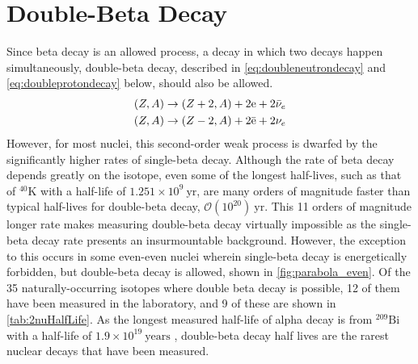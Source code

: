 \section{Double-Beta Decay}
\label{sec:Double Beta Decay}
Since beta decay is an allowed process, a decay in which two decays happen simultaneously, double-beta decay, described in \autoref{eq:doubleneutrondecay} and \autoref{eq:doubleprotondecay} below, should also be allowed.
\begin{align}
    (Z, A) & \rightarrow (Z+2, A)+2\textrm{e}+2\Bar{\nu}_e \label{eq:doubleneutrondecay} \\
    (Z, A) & \rightarrow (Z-2, A)+2\Bar{\textrm{e}}+2\nu_e \label{eq:doubleprotondecay} 
\end{align}
However, for most nuclei, this second-order weak process is dwarfed by the significantly higher rates of single-beta decay.
Although the rate of beta decay depends greatly on the isotope, even some of the longest half-lives, such as that of $^{40}$K with a half-life of $1.251\times10^{9}~\textrm{yr}$, are many orders of magnitude faster than typical half-lives for double-beta decay, $\mathcal{O}(10^{20})~\textrm{yr}$.
This 11 orders of magnitude longer rate makes measuring double-beta decay virtually impossible as the single-beta decay rate presents an insurmountable background.
However, the exception to this occurs in some even-even nuclei wherein single-beta decay is energetically forbidden, but double-beta decay is allowed, shown in \autoref{fig:parabola_even}.
Of the 35 naturally-occurring isotopes where double beta decay is possible, 12 of them have been measured in the laboratory, and 9 of these are shown in \autoref{tab:2nuHalfLife}.
As the longest measured half-life of alpha decay is from $^{209}\textrm{Bi}$ with a half-life of $1.9 \times 10^{19}~\textrm{years}$ \cite{Marcillac:2003Bi-209detection}, double-beta decay half lives are the rarest nuclear decays that have been measured.

